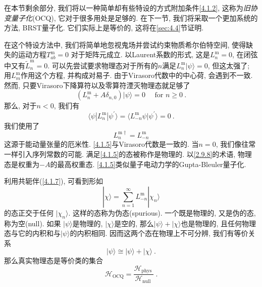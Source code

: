 在本节剩余部分, 我们将以一种简单却有些特设的方式附加条件\eqref{4.1.2}, 这称为\emph{旧协变量子化}(OCQ), 它对于很多用处是足够的. 在下一节, 我们将采取一个更加系统的方法, 
BRST量子化. 它们实际上是等价的, 这将在\ref{sec:4.4}节证明.

在这个特设方法中, 我们将简单地忽视鬼场并尝试约束物质希尔伯特空间, 使得缺失的运动方程$T_{a b}^{\mathrm{m}}=0$ 对于矩阵元成立. 以Laurent系数的形式, 
这是$L_{n}^{\mathrm{m}}=0$, 在闭弦中又有$\tilde{L}_{n}^{\mathrm{m}}=0 $. 可以先尝试要求物理态对于所有的$n$满足$L_{n}^{\mathrm{m}}|\psi\rangle=0$, 
但这太强了; 用$L_{m}^{\mathrm{m}}$作用这个方程, 并构成对易子. 由于Virasoro代数中的中心荷, 会遇到不一致. 然而, 只要Virasoro下降算符以及零算符湮灭物理态就足够了
\begin{equation}\label{4.1.5}
(L_{n}^{\mathrm{m}}+A \delta_{n, 0})|\psi\rangle=0 \quad \text { for } n \geq 0 \:.
\end{equation}
那么, 对于$n<0$, 我们有
\begin{equation}
\langle\psi |L_{n}^{\mathrm{m}} | \psi^{\prime}\rangle= \langle L_{-n}^{\mathrm{m}} \psi \vert \psi^{\prime}\rangle=0 \:. \label{4.1.6}
\end{equation}
我们使用了
\begin{equation}\label{4.1.7}
L_{n}^{\mathrm{m} \dagger}=L_{-n}^{\mathrm{m}}
\end{equation}
这源于能动量张量的厄米性. \eqref{4.1.5}与Virasoro代数是一致的. 当$n=0$, 我们像往常一样引入序列常数的可能. 满足\eqref{4.1.5}的态被称作是物理的. 
以\eqref{2.9.8}的术语, 物理态是权重为$-A$的最高权重态. \eqref{4.1.5}类似量子电动力学的Gupta-Bleuler量子化. 

利用共轭伴(\ref{4.1.7}), 可看到形如
\begin{equation}\label{4.1.8}
|\chi\rangle=\sum_{n=1}^{\infty} L_{-n}^{\mathrm{m}}|\chi_{n}\rangle
\end{equation}
的态正交于任何 $|\chi_{n}\rangle$. 这样的态称为伪态(spurious). 一个既是物理的, 又是伪的态, 称为空(null). 如果 $|\psi\rangle$是物理的, 
$|\chi\rangle$是空的, 那么$|\psi\rangle+|\chi\rangle$也是物理的, 且任何物理态与它的内积和与$|\psi\rangle$的内积相同. 因而这两个态在物理上不可分辨, 
我们有等价关系
\begin{equation}
|\psi\rangle \cong  |\psi\rangle+|\chi\rangle \:. \label{4.1.9}
\end{equation}
那么真实物理态是等价类的集合
\begin{equation}
\mathscr{H}_{\mathrm{OCQ}}=\frac{\mathscr{H}_{\text {phys }}}{\mathscr{H}_{\text {null }}} \:. \label{4.1.10}
\end{equation}

